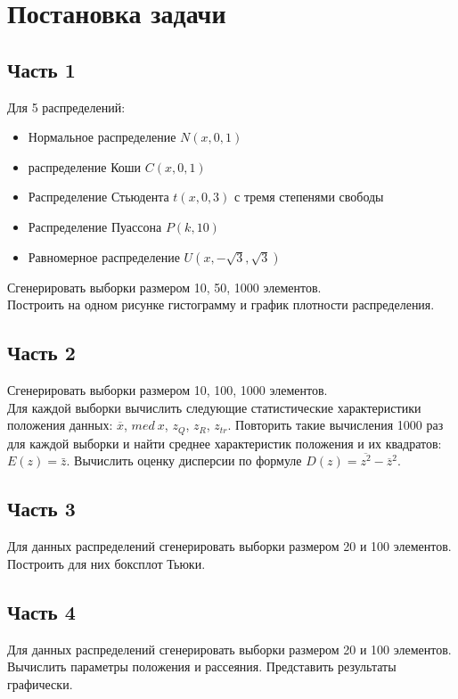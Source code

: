\newpage
\section{Постановка задачи}

\subsection{Часть 1}
Для 5 распределений:
\begin{itemize}
    \item Нормальное распределение $N(x, 0, 1)$
    \item распределение Коши $C(x, 0, 1)$
    \item Распределение Стьюдента $t(x, 0, 3)$ с тремя степенями свободы
    \item Распределение Пуассона $P(k, 10)$
    \item Равномерное распределение $U(x, -\sqrt3, \sqrt3)$
\end{itemize}
Сгенерировать выборки размером 10, 50, 1000 элементов.\\
Построить на одном рисунке гистограмму и график плотности распределения.

\subsection{Часть 2}
Сгенерировать выборки размером 10, 100, 1000 элементов.\\
Для каждой выборки вычислить следующие статистические характеристики положения данных: $\overline{x}$, $med\:x$, $z_{Q}$, $z_{R}$, $z_{tr}$. Повторить такие вычисления 1000 раз для каждой выборки и найти среднее характеристик положения и их квадратов: $E(z) = \bar{z}$. Вычислить оценку дисперсии по формуле $D(z) = \overline{z^2} - \overline{z}^2$.

\subsection{Часть 3}
Для данных распределений сгенерировать выборки размером 20 и 100 элементов. Построить для них боксплот Тьюки.

\subsection{Часть 4}
Для данных распределений сгенерировать выборки размером 20 и 100 элементов. Вычислить параметры положения и рассеяния. Представить результаты графически.

